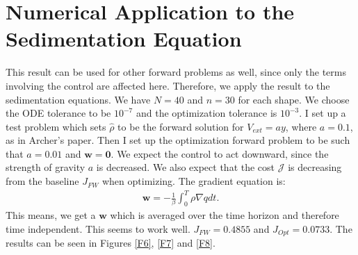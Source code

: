 \documentclass[11pt, a4paper]{article}
\theoremstyle{definition}
\newcommand{\w}{\mathbf{w}}
\newcommand{\hr}{\widehat \rho}
\begin{document}
	\section{Numerical Application to the Sedimentation Equation}
	This result can be used for other forward problems as well, since only the terms involving the control are affected here. Therefore, we apply the result to the sedimentation equations.
	We have $N = 40$ and $n = 30$ for each shape. We choose the ODE tolerance to be $10^{-7}$ and the optimization tolerance is $10^{-3}$.
	I set up a test problem which sets $\hr$ to be the forward solution for $V_{ext} = ay$, where $a = 0.1$, as in Archer's paper. Then I set up the optimization forward problem to be such that $a = 0.01$ and $\w = \mathbf 0$. We expect the control to act downward, since the strength of gravity $a$ is decreased.
	We also expect that the cost $\mathcal J$ is decreasing from the baseline $J_{FW}$ when optimizing.
	The gradient equation is:
	\begin{align*}
		\w = - \frac{1}{\beta}\int_0^T \rho \nabla q dt.
	\end{align*}
	This means, we get a $\w$ which is averaged over the time horizon and therefore time independent. This seems to work well. $J_{FW} = 0.4855$ and $J_{Opt} = 0.0733$. The results can be seen in Figures \ref{F6}, \ref{F7} and \ref{F8}.
	
\end{document}
